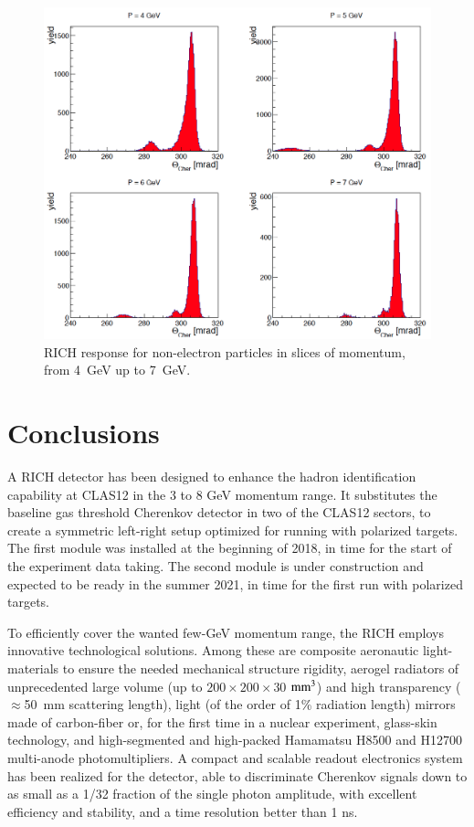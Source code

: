 \documentclass[5p,times,twocolumn]{elsarticle}
\begin{document}
\begin{figure}[t]
\begin{center}
\includegraphics[width=1.0\columnwidth]{Pslices.png}
\end{center}
\caption{RICH response for non-electron particles in slices of momentum, from 4~GeV up to 7~GeV.}
\label{Fig:CHhad2}
\end{figure}

\section{Conclusions}

A RICH detector has been designed to enhance the hadron identification capability 
at CLAS12 in the 3 to 8 GeV momentum range. It substitutes the baseline gas threshold Cherenkov detector 
in two of the CLAS12 sectors, to create a symmetric left-right setup 
optimized for running with polarized targets. The first module was
installed at the beginning of 2018, in time for the start of the experiment data 
taking. The second module is under construction and expected to be ready in 
the summer 2021, in time for the first run with polarized targets.

To efficiently cover the wanted few-GeV momentum range, the RICH employs 
innovative technological solutions. Among these are composite 
aeronautic light-materials to ensure the needed mechanical structure rigidity, 
aerogel radiators of unprecedented large volume (up to $200 \times 200 \times 30$ $\rm mm^3$) 
and high transparency ($\approx$50~mm scattering length), light 
(of the order of 1\% radiation length) mirrors made of carbon-fiber or, for
the first time in a nuclear experiment, glass-skin technology, and
high-segmented and high-packed Hamamatsu H8500 and H12700 multi-anode photomultipliers.
A compact and scalable readout electronics system has been realized for 
the detector, able to discriminate Cherenkov signals down to as small as a 1/32 fraction
of the single photon amplitude, with excellent efficiency and stability,
and a time resolution better than 1 ns.
\end{document}
